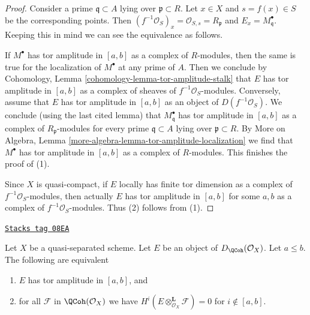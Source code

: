 \begin{proof}
Consider a prime $\mathfrak q \subset A$ lying over $\mathfrak p \subset R$.
Let $x \in X$ and $s = f(x) \in S$ be the corresponding points.
Then $(f^{-1}\mathcal{O}_S)_x = \mathcal{O}_{S, s} = R_\mathfrak p$
and $E_x = M^\bullet_\mathfrak q$. Keeping this in mind we can see
the equivalence as follows.

\medskip\noindent
If $M^\bullet$ has tor amplitude in $[a, b]$ as a complex of $R$-modules,
then the same is true for the localization of $M^\bullet$ at any prime of $A$.
Then we conclude by
Cohomology, Lemma \ref{cohomology-lemma-tor-amplitude-stalk}
that $E$ has tor amplitude in $[a, b]$ as a complex of sheaves
of $f^{-1}\mathcal{O}_S$-modules.
Conversely, assume that $E$ has tor amplitude in $[a, b]$
as an object of $D(f^{-1}\mathcal{O}_S)$.
We conclude (using the last cited lemma) that
$M^\bullet_\mathfrak q$ has tor amplitude in $[a, b]$
as a complex of $R_\mathfrak p$-modules for every
prime $\mathfrak q \subset A$ lying over $\mathfrak p \subset R$.
By More on Algebra, Lemma \ref{more-algebra-lemma-tor-amplitude-localization}
we find that $M^\bullet$ has tor amplitude in $[a, b]$
as a complex of $R$-modules.
This finishes the proof of (1).

\medskip\noindent
Since $X$ is quasi-compact, if $E$ locally has finite tor dimension
as a complex of $f^{-1}\mathcal{O}_S$-modules, then actually $E$
has tor amplitude in $[a, b]$ for some $a, b$ as a complex of
$f^{-1}\mathcal{O}_S$-modules. Thus (2) follows from (1).
\end{proof}

\begin{lemma}[Tor qc qs]
\label{perfect-lemma-tor-qc-qs}
\href{https://stacks.math.columbia.edu/tag/08EA}{\texttt{Stacks tag 08EA}}

Let $X$ be a quasi-separated scheme. Let $E$ be an object
of $D_\QCoh(\mathcal{O}_X)$. Let $a \leq b$. The
following are equivalent
\begin{enumerate}
\item $E$ has tor amplitude in $[a, b]$, and
\item for all $\mathcal{F}$ in $\QCoh(\mathcal{O}_X)$
we have $H^i(E \otimes_{\mathcal{O}_X}^\mathbf{L} \mathcal{F}) = 0$
for $i \not \in [a, b]$.
\end{enumerate}
\end{lemma}

